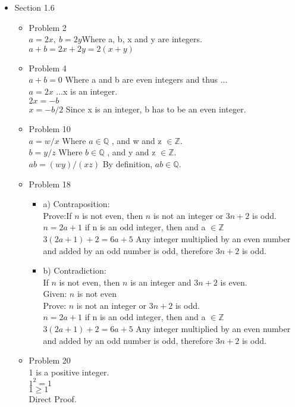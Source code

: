 \documentclass[10pt,a4paper]{article}
\begin{document}
\begin{itemize}
  \item Section 1.6
    \begin{itemize}
      \item Problem 2\\
        $a = 2x,\:b = 2y$\hfill Where a, b, x and y are integers.\\
        $a + b = 2x + 2y = 2(x + y)$
      \item Problem 4\\
        $a + b = 0$ \hfill Where a and b are even integers and thus ...\\
        $a = 2x$    \hfill ...x is an integer.\\
        $2x = -b$\\
        $x = -b/2$ \hfill Since x is an integer, b has to be an even integer.
      \item Problem 10\\
        $a = w/x$ \hfill Where $a\in \mathbb{Q}$ , and w and z $\in \mathbb{Z}$.\\
        $b = y/z$ \hfill Where $b\in \mathbb{Q}$ , and y and z $\in \mathbb{Z}$.\\
        $ab = (wy)/(xz)$ \hfill By definition, ${ab} \in \mathbb{Q}$.
      \item Problem 18
        \begin{itemize}
          \item a) Contraposition:\\
            Prove:If $n$ is not even, then $n$ is not an integer or $3n+2$ is odd.\\
            $n = 2a + 1$ \hfill if n is an odd integer, then and a $\in \mathbb{Z}$\\
            $3(2a + 1) +2 = 6a + 5$ \hfill Any integer multiplied by an even number and added by an odd number is odd, therefore $3n+2$ is odd.\\
          \item b) Contradiction:\\
            If $n$ is not even, then $n$ is an integer and $3n+2$ is even.\\
            Given: $n$ is not even\\
            Prove: $n$ is not an integer or $3n+2$ is odd.\\
            $n = 2a + 1$ \hfill if n is an odd integer, then and a $\in \mathbb{Z}$\\
            $3(2a + 1) +2 = 6a + 5$ \hfill Any integer multiplied by an even number and added by an odd number is odd, therefore $3n+2$ is odd.\\
        \end{itemize}
      \item Problem 20\\
        1 is a positive integer.\\
        $1^{2}=1$\\
        $1\ge 1$\\
        Direct Proof.
    \end{itemize}
\end{itemize}
\end{document}
